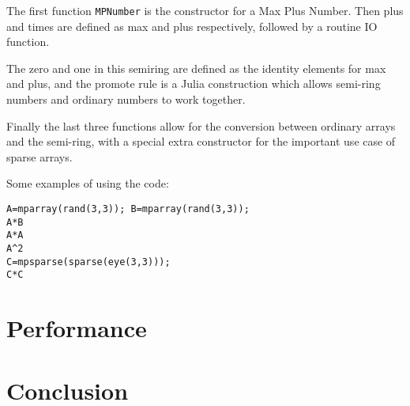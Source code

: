 \documentclass[conference]{IEEEtran}
\begin{document}
The first function \verb+MPNumber+ is the constructor for a Max Plus Number.
Then plus and times are defined as max and plus respectively, followed by 
a routine IO function.

The zero and one in this semiring are defined as the identity elements for max and plus,
and the promote rule is a Julia construction which allows semi-ring numbers and ordinary
numbers to work together.

Finally the last three functions allow for the conversion between ordinary arrays and the semi-ring, with a special extra constructor for the important use case of sparse arrays.

Some examples of using the code:


\begin{verbatim}
A=mparray(rand(3,3)); B=mparray(rand(3,3));
A*B
A*A
A^2
C=mpsparse(sparse(eye(3,3)));
C*C
\end{verbatim}





\section{Performance}


\section{Conclusion}



\end{document}
